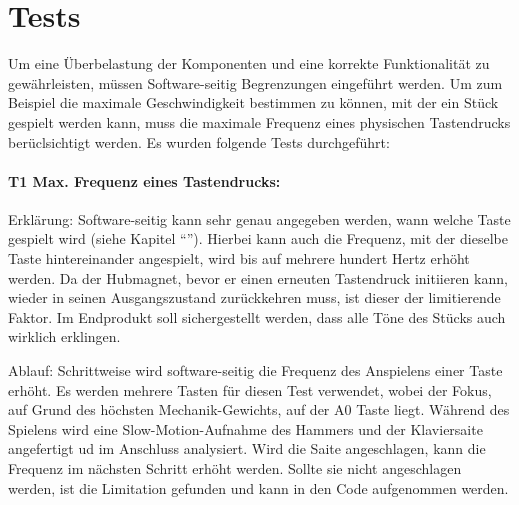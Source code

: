 \chapter{Tests}\label{tests}

\nocite{*}

Um eine Überbelastung der Komponenten und eine korrekte Funktionalität zu gewährleisten, müssen Software-seitig Begrenzungen eingeführt werden.
Um zum Beispiel die maximale Geschwindigkeit bestimmen zu können, mit der ein Stück gespielt werden kann, muss die maximale Frequenz eines physischen Tastendrucks berüclsichtigt werden.
Es wurden folgende Tests durchgeführt:

\subsubsection{T1 Max. Frequenz eines Tastendrucks:}

Erklärung: Software-seitig kann sehr genau angegeben werden, wann welche Taste gespielt wird (siehe Kapitel \enquote{}).
Hierbei kann auch die Frequenz, mit der dieselbe Taste hintereinander angespielt, wird bis auf mehrere hundert Hertz erhöht werden.
Da der Hubmagnet, bevor er einen erneuten Tastendruck initiieren kann, wieder in seinen Ausgangszustand zurückkehren muss, ist dieser der limitierende Faktor.
Im Endprodukt soll sichergestellt werden, dass alle Töne des Stücks auch wirklich erklingen. %

Ablauf: Schrittweise wird software-seitig die Frequenz des Anspielens einer Taste erhöht.
Es werden mehrere Tasten für diesen Test verwendet, wobei der Fokus, auf Grund des höchsten Mechanik-Gewichts, auf der A0 Taste liegt. %
Während des Spielens wird eine Slow-Motion-Aufnahme des Hammers und der Klaviersaite angefertigt ud im Anschluss analysiert.
Wird die Saite angeschlagen, kann die Frequenz im nächsten Schritt erhöht werden.
Sollte sie nicht angeschlagen werden, ist die Limitation gefunden und kann in den Code aufgenommen werden.

